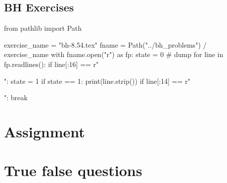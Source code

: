 \subsection{BH Exercises}
\label{sec:bh-exercises-1}



\begin{pycode}
from pathlib import Path

exercise_name = "bh-8.54.tex"
fname = Path("../bh_problems") / exercise_name
with fname.open("r") as fp:
    state = 0  # dump
    for line in fp.readlines():
        if line[:16] == r"\begin{exercise}":
            state = 1
        if state == 1:
            print(line.strip())
        if line[:14] == r"\end{exercise}":
            break
\end{pycode}







\section{Assignment}
\label{sec:assignment}





\section{True false questions}
\label{sec:true-false-questions}
\setcounter{theorem}{0}




